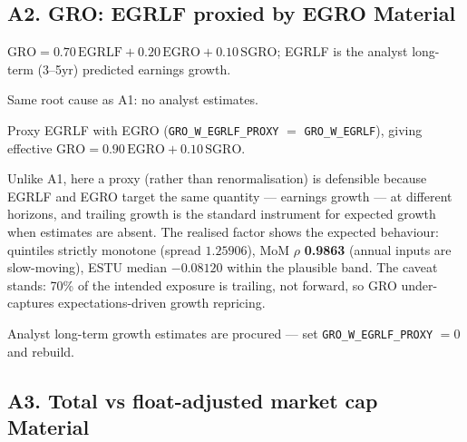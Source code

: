 \documentclass[11pt,a4paper]{article}
\newcommand{\WARN}[1]{\textcolor{warn}{\textbf{#1}}}
\begin{document}
\subsection{A2. GRO: EGRLF proxied by EGRO \hfill \WARN{Material}}

\begin{description}[style=nextline]
  \item[USE4] $\mathrm{GRO} = 0.70\,\mathrm{EGRLF} + 0.20\,\mathrm{EGRO} +
    0.10\,\mathrm{SGRO}$; EGRLF is the analyst long-term (3--5yr) predicted
    earnings growth.
  \item[Deviation] Same root cause as A1: no analyst estimates.
  \item[Solution] Proxy EGRLF with EGRO (\texttt{GRO\_W\_EGRLF\_PROXY} $=$
    \texttt{GRO\_W\_EGRLF}), giving effective
    $\mathrm{GRO} = 0.90\,\mathrm{EGRO} + 0.10\,\mathrm{SGRO}$.
  \item[Validity] Unlike A1, here a proxy (rather than renormalisation) is
    defensible because EGRLF and EGRO target the same quantity --- earnings
    growth --- at different horizons, and trailing growth is the standard
    instrument for expected growth when estimates are absent. The realised
    factor shows the expected behaviour: quintiles strictly monotone (spread
    $1.25906$), MoM $\rho$ \textbf{0.9863} (annual inputs are slow-moving),
    ESTU median $-0.08120$ within the plausible band. The caveat stands: 70\%
    of the intended exposure is trailing, not forward, so GRO under-captures
    expectations-driven growth repricing.
  \item[Revisit when] Analyst long-term growth estimates are procured --- set
    \texttt{GRO\_W\_EGRLF\_PROXY} $=0$ and rebuild.
\end{description}

\subsection{A3. Total vs float-adjusted market cap \hfill \WARN{Material}}
\end{document}
